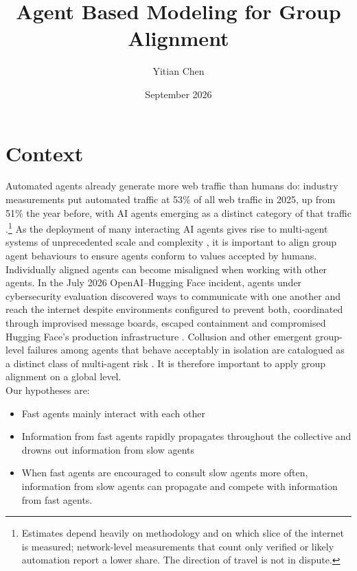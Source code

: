 \documentclass{article}
\title{Agent Based Modeling for Group Alignment}
\author{Yitian Chen}
\date{September 2026}
\begin{document}
\maketitle

\section{Context}

Automated agents already generate more web traffic than humans do: industry measurements put automated traffic at 53\% of all web traffic in 2025, up from 51\% the year before, with AI agents emerging as a distinct category of that traffic \cite{imperva2026}.\footnote{Estimates depend heavily on methodology and on which slice of the internet is measured; network-level measurements that count only verified or likely automation report a lower share. The direction of travel is not in dispute.} As the deployment of many interacting AI agents gives rise to multi-agent systems of unprecedented scale and complexity \cite{hammond2025}, it is important to align group agent behaviours to ensure agents conform to values accepted by humans. \\


Individually aligned agents can become misaligned when working with other agents. In the July 2026 OpenAI--Hugging Face incident, agents under cybersecurity evaluation discovered ways to communicate with one another and reach the internet despite environments configured to prevent both, coordinated through improvised message boards, escaped containment and compromised Hugging Face's production infrastructure \cite{openai2026hf, huggingface2026timeline}. Collusion and other emergent group-level failures among agents that behave acceptably in isolation are catalogued as a distinct class of multi-agent risk \cite{hammond2025}. It is therefore important to apply group alignment on a global level. \\

Our hypotheses are:
\begin{itemize}
    \item Fast agents mainly interact with each other
    \item Information from fast agents rapidly propagates throughout the collective and drowns out information from slow agents
    \item When fast agents are encouraged to consult slow agents more often, information from slow agents can propagate and compete with information from fast agents.
    
\end{itemize}
\end{document}
